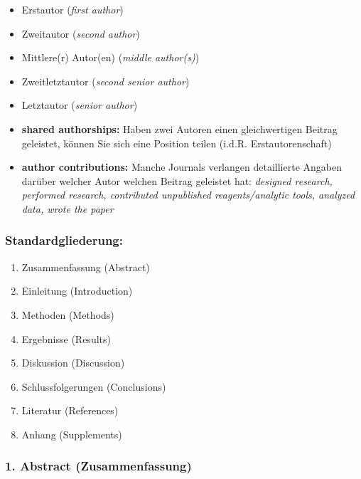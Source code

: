 \documentclass[
]{book}
\providecommand{\tightlist}{%
  \setlength{\itemsep}{0pt}\setlength{\parskip}{0pt}}
\begin{document}
\begin{itemize}
\item
  Erstautor (\emph{first author})
\item
  Zweitautor (\emph{second author})
\item
  Mittlere(r) Autor(en) (\emph{middle author(s)})
\item
  Zweitletztautor (\emph{second senior author})
\item
  Letztautor (\emph{senior author})
\item
  \textbf{shared authorships:} Haben zwei Autoren einen gleichwertigen Beitrag geleistet, können Sie sich eine Position teilen (i.d.R. Erstautorenschaft)
\item
  \textbf{author contributions:} Manche Journals verlangen detaillierte Angaben darüber welcher Autor welchen Beitrag geleistet hat:
  \emph{designed research, performed research, contributed unpublished reagents/analytic tools, analyzed data, wrote the paper}
\end{itemize}

\hypertarget{standardgliederung}{%
\subsubsection{Standardgliederung:}\label{standardgliederung}}

\begin{enumerate}
\def\labelenumi{\arabic{enumi}.}
\tightlist
\item
  Zusammenfassung (Abstract)
\item
  Einleitung (Introduction)
\item
  Methoden (Methods)
\item
  Ergebnisse (Results)
\item
  Diskussion (Discussion)
\item
  Schlussfolgerungen (Conclusions)
\item
  Literatur (References)
\item
  Anhang (Supplements)
\end{enumerate}

\hypertarget{abstract-zusammenfassung}{%
\subsubsection{1. Abstract (Zusammenfassung)}\label{abstract-zusammenfassung}}
\end{document}
